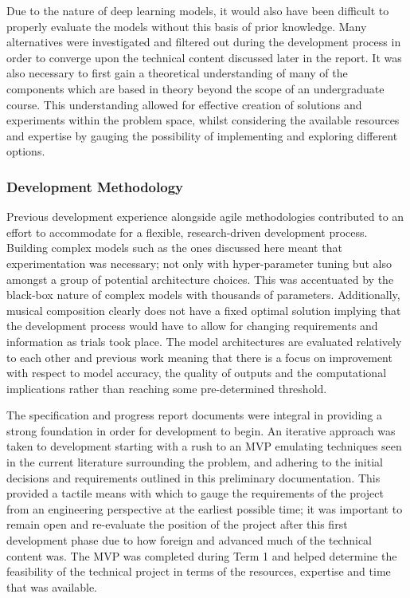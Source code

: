 \documentclass[12pt,]{article}
\begin{document}
Due to the nature of deep learning models, it would also have been
difficult to properly evaluate the models without this basis of prior
knowledge. Many alternatives were investigated and filtered out during
the development process in order to converge upon the technical content
discussed later in the report. It was also necessary to first gain a
theoretical understanding of many of the components which are based in
theory beyond the scope of an undergraduate course. This understanding
allowed for effective creation of solutions and experiments within the
problem space, whilst considering the available resources and expertise
by gauging the possibility of implementing and exploring different
options.

\hypertarget{development-methodology}{%
\subsubsection{Development Methodology}\label{development-methodology}}

Previous development experience alongside agile methodologies
contributed to an effort to accommodate for a flexible, research-driven
development process. Building complex models such as the ones discussed
here meant that experimentation was necessary; not only with
hyper-parameter tuning but also amongst a group of potential
architecture choices. This was accentuated by the black-box nature of
complex models with thousands of parameters. Additionally, musical
composition clearly does not have a fixed optimal solution implying that
the development process would have to allow for changing requirements
and information as trials took place. The model architectures are
evaluated relatively to each other and previous work meaning that there
is a focus on improvement with respect to model accuracy, the quality of
outputs and the computational implications rather than reaching some
pre-determined threshold.

The specification and progress report documents were integral in
providing a strong foundation in order for development to begin. An
iterative approach was taken to development starting with a rush to an
MVP emulating techniques seen in the current literature surrounding the
problem, and adhering to the initial decisions and requirements outlined
in this preliminary documentation. This provided a tactile means with
which to gauge the requirements of the project from an engineering
perspective at the earliest possible time; it was important to remain
open and re-evaluate the position of the project after this first
development phase due to how foreign and advanced much of the technical
content was. The MVP was completed during Term 1 and helped determine
the feasibility of the technical project in terms of the resources,
expertise and time that was available.
\end{document}
